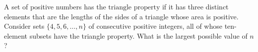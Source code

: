 A set of positive numbers has the $\text{triangle property}$ if it has three distinct elements that are the lengths of the sides of a triangle whose area is positive. Consider sets $\{4, 5, 6, \ldots, n\}$ of consecutive positive integers, all of whose ten-element subsets have the triangle property. What is the largest possible value of $n$?